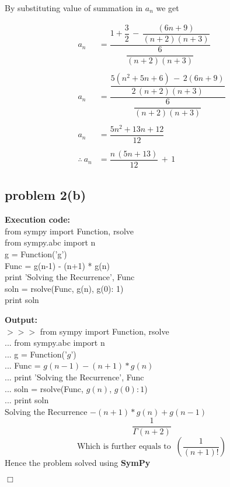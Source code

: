 \documentclass{article}
\newcommand{\qed}{\hfill \ensuremath{\Box}}
\begin{document}
By substituting value of summation in $a_n$ we get

\begin{align*}
a_n &= \dfrac{1+\dfrac{3}{2}\,-\,\dfrac{(6n+9)}{(n+2)(n+3)}}{\dfrac{6}{(n+2)(n+3)}}
\\ \\
a_n &= \dfrac{\dfrac{5(n^2+5n+6)\,-\,2(6n+9)}{2\,(n+2)(n+3)}}{\dfrac{6}{(n+2)(n+3)}} 
\\ \\
a_n &= \dfrac{5n^2+13n+12}{12} 
\\ \\
\therefore \: a_n &= \dfrac{n\,(5n+13)}{12}\,+\,1
\end{align*}

\newpage
\subsection*{problem 2(b)}
\textbf{Execution code:} \\
from sympy import Function, rsolve \\
from sympy.abc import n \\
g = Function('g') \\
Func = g(n-1) - (n+1) * g(n) \\
print 'Solving the Recurrence', Func \\
soln = rsolve(Func, g(n), {g(0): 1}) \\
print soln
\null \par \null
\null \par \null
\noindent \textbf{Output:} \\ 
$>>>$ from sympy import Function, rsolve \\
... from sympy.abc import n \\
... g = Function('$g$') \\
... Func = $g(n-1) - (n+1) * g(n)$ \\
... print 'Solving the Recurrence', Func \\
... soln = rsolve(Func, $g(n)$, {$g(0): 1$}) \\
... print soln \\
Solving the Recurrence $-(n + 1)*g(n) + g(n - 1)$
$$\dfrac{1}{\Gamma(n+2)}$$
$$\text{Which is further equals to}\;\;\left(\dfrac{1}{(n+1)!}\right)$$
Hence the problem solved using \textbf{SymPy}
\null \par \null
\qed

\newpage
\end{document}
